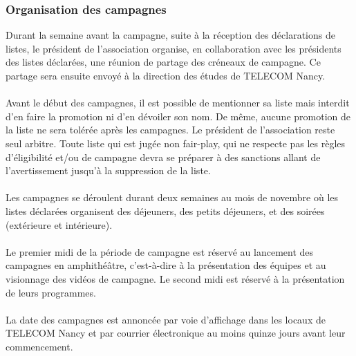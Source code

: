 \documentclass{article} %
\begin{document}
			\subsubsection{Organisation des campagnes}
\label{ssub:organisation_des_campagnes}

				Durant la semaine avant la campagne, suite à la réception des
				déclarations de listes, le président de l’association organise,
				en collaboration avec les présidents des listes déclarées, une
				réunion de partage des créneaux de campagne. Ce partage sera
				ensuite envoyé à la direction des études de TELECOM Nancy.

                \paragraph{}
				Avant le début des campagnes, il est possible de mentionner sa
				liste mais interdit d’en faire la promotion ni d'en dévoiler son
				nom. De même, aucune promotion de la liste ne sera tolérée après
				les campagnes. Le président de l’association reste seul arbitre.
				Toute liste qui est jugée non fair-play, qui ne respecte pas les
				règles d’éligibilité et/ou de campagne devra se préparer à des
				sanctions allant de l’avertissement jusqu'à la suppression de la
				liste.

                \paragraph{}
				Les campagnes se déroulent durant deux semaines au mois de
				novembre où les listes déclarées organisent des déjeuners, des
				petits déjeuners, et des soirées (extérieure et intérieure).
				
				\paragraph{}
				Le premier midi de la période de campagne est réservé au
				lancement des campagnes en amphithéâtre, c’est-à-dire à la
				présentation des équipes et au visionnage des vidéos de campagne.
				Le second midi est réservé à la présentation de leurs
				programmes.

                \paragraph{}
				La date des campagnes est annoncée par voie d’affichage dans les
				locaux de TELECOM Nancy et par courrier électronique au moins
				quinze jours avant leur commencement.
\end{document}

